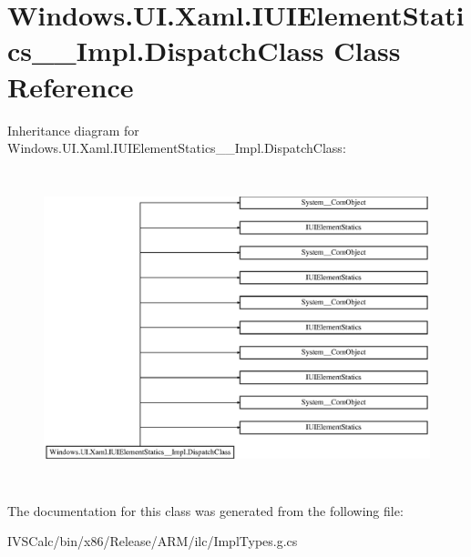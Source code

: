 \hypertarget{class_windows_1_1_u_i_1_1_xaml_1_1_i_u_i_element_statics_____impl_1_1_dispatch_class}{}\section{Windows.\+U\+I.\+Xaml.\+I\+U\+I\+Element\+Statics\+\_\+\+\_\+\+Impl.\+Dispatch\+Class Class Reference}
\label{class_windows_1_1_u_i_1_1_xaml_1_1_i_u_i_element_statics_____impl_1_1_dispatch_class}
Inheritance diagram for Windows.\+U\+I.\+Xaml.\+I\+U\+I\+Element\+Statics\+\_\+\+\_\+\+Impl.\+Dispatch\+Class\+:\begin{figure}[H]
\begin{center}
\leavevmode
\includegraphics[height=9.166667cm]{class_windows_1_1_u_i_1_1_xaml_1_1_i_u_i_element_statics_____impl_1_1_dispatch_class}
\end{center}
\end{figure}


The documentation for this class was generated from the following file\+:\begin{DoxyCompactItemize}
\item 
I\+V\+S\+Calc/bin/x86/\+Release/\+A\+R\+M/ilc/Impl\+Types.\+g.\+cs\end{DoxyCompactItemize}
